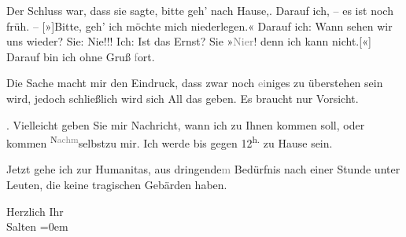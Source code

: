 \pstart
           Der Schluss war, dass sie
               sagte, bitte geh’ nach Hause,. Darauf ich, – es ist noch früh. –
                  {[}»{]}Bitte, geh’ ich möchte mich niederlegen.« Darauf ich: Wann
               sehen wir uns wieder? Sie:
               Nie!!! Ich: Ist das Ernst? Sie »\textcolor{gray}{Ni{\geminationm}er}! {\pb}denn ich kann
                  nicht.{[}«{]} Darauf bin ich ohne Gruß \textcolor{gray}{f}ort.\pend
           
\pstart
           Die Sache macht mir den Eindruck, dass zwar noch \textcolor{gray}{ei}niges zu
               überstehen sein wird, jedoch schließlich wird sich All das geben. Es braucht nur
               Vorsicht.\pend
           
\pstart
           \label{K_L03149-2v}\label{K_L03149-2}. Vielleicht geben Sie mir Nachricht, wann ich zu Ihnen kommen soll, oder
               kommen \substVorne{}\textsuperscript{N\textcolor{gray}{achm}}\substDazwischen{}selbst\substHinten{}{ }{\pb}zu mir. Ich werde bis gegen
                     12\textsuperscript{h.}{ }zu Hause sein.\pend
           
\pstart
           Jetzt gehe ich zur Humanitas, aus
                  dringende\textcolor{gray}{m} Bedürfnis nach einer Stunde unter Leuten, die keine
               tragischen Gebärden haben.\pend
           
\pstart
           Herzlich Ihr {\\[\baselineskip]}\spacefill\mbox{Salten}\pend
           \leftskip=0em{}\endnumbering{}  \newcommand{\dateiname}{L03149}\newcommand{\titel}{Felix Salten an Arthur Schnitzler, [26. 1. 1895]}\newcommand{\editorInnen}{Martin Anton Müller und Laura Untner}
